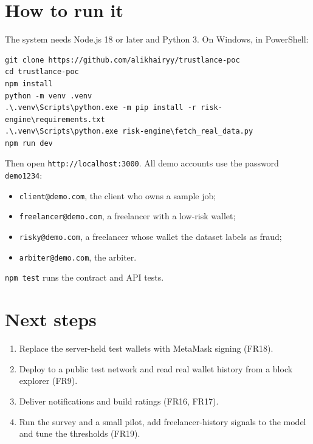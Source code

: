 \section{How to run it}
The system needs Node.js 18 or later and Python 3. On Windows, in PowerShell:

\noindent\begin{minipage}{\linewidth}
\begin{lstlisting}
git clone https://github.com/alikhairyy/trustlance-poc
cd trustlance-poc
npm install
python -m venv .venv
.\.venv\Scripts\python.exe -m pip install -r risk-engine\requirements.txt
.\.venv\Scripts\python.exe risk-engine\fetch_real_data.py
npm run dev
\end{lstlisting}
\end{minipage}

Then open \texttt{http://localhost:3000}. All demo accounts use the password \texttt{demo1234}:
\begin{itemize}
\item \texttt{client@demo.com}, the client who owns a sample job;
\item \texttt{freelancer@demo.com}, a freelancer with a low-risk wallet;
\item \texttt{risky@demo.com}, a freelancer whose wallet the dataset labels as fraud;
\item \texttt{arbiter@demo.com}, the arbiter.
\end{itemize}
\texttt{npm test} runs the contract and API tests.

\section{Next steps}
\begin{enumerate}
\item Replace the server-held test wallets with MetaMask signing (FR18).
\item Deploy to a public test network and read real wallet history from a block explorer (FR9).
\item Deliver notifications and build ratings (FR16, FR17).
\item Run the survey and a small pilot, add freelancer-history signals to the model and tune the thresholds (FR19).
\end{enumerate}
